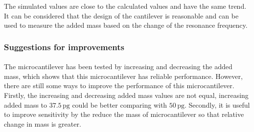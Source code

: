 \documentclass[a4paper,12pt,reqno]{report}
\begin{document}
    \begin{figure}[H]
        \centering
        \vspace{-0.35cm}
        \subfigtopskip=2pt
        \subfigbottomskip=2pt
        \subfigcapskip=-5pt
        \quad
        \label{Eigenfrequency1}
    \end{figure}
    The simulated values are close to the calculated values and have the same trend. 
    It can be considered that the design of the cantilever is reasonable and can be 
    used to measure the added mass based on the change of the resonance frequency.
    \subsubsection{Suggestions for improvements}
        \paragraph{}
        The microcantilever has been tested by increasing and decreasing the added mass, 
        which shows that this microcantilever has reliable performance. However, there are 
        still some ways to improve the performance of this microcantilever. Firstly, 
        the increasing and decreasing added mass values are not equal, increasing added 
        mass to $37.5\,\unit{\pg}$ could be better comparing with $50\,\unit{\pg}$. Secondly, it is useful to 
        improve sensitivity by the reduce the mass of microcantilever so that relative 
        change in mass is greater.

\end{document}
